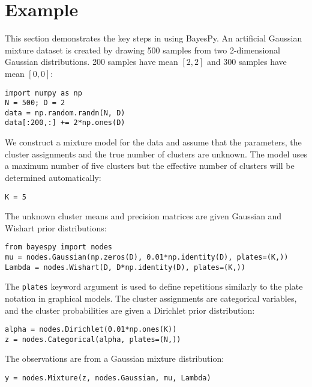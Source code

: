 \documentclass[twoside,11pt]{article}
\begin{document}










\section{Example}

This section demonstrates the key steps in using BayesPy.  An artificial
Gaussian mixture dataset is created by drawing 500 samples from two
2-dimensional Gaussian distributions.  200 samples have mean $[2, 2]$ and 300
samples have mean $[0, 0]$:
\begin{lstlisting}
import numpy as np
N = 500; D = 2
data = np.random.randn(N, D)
data[:200,:] += 2*np.ones(D)
\end{lstlisting}
We construct a mixture model for the data and assume that the parameters, the
cluster assignments and the true number of clusters are unknown.  The model uses
a maximum number of five clusters but the effective number of clusters will be
determined automatically:
\begin{lstlisting}
K = 5
\end{lstlisting}
The unknown cluster means and precision matrices are given Gaussian and Wishart
prior distributions:
\begin{lstlisting}
from bayespy import nodes
mu = nodes.Gaussian(np.zeros(D), 0.01*np.identity(D), plates=(K,))
Lambda = nodes.Wishart(D, D*np.identity(D), plates=(K,))
\end{lstlisting}
The \texttt{plates} keyword argument is used to define repetitions similarly to
the plate notation in graphical models.  The cluster assignments are categorical
variables, and the cluster probabilities are given a Dirichlet prior
distribution:
\begin{lstlisting}
alpha = nodes.Dirichlet(0.01*np.ones(K))
z = nodes.Categorical(alpha, plates=(N,))
\end{lstlisting}
The observations are from a Gaussian mixture distribution:
\begin{lstlisting}
y = nodes.Mixture(z, nodes.Gaussian, mu, Lambda)
\end{lstlisting}
\end{document}
